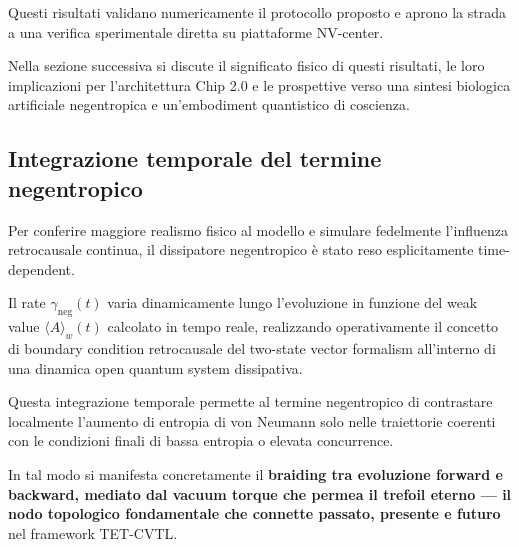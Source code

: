 \documentclass[11pt,a4paper]{article}
\theoremstyle{plain}
\theoremstyle{definition}
\begin{document}
\vspace{0.3cm}

Questi risultati validano numericamente il protocollo proposto e aprono la strada a una verifica sperimentale diretta su piattaforme NV-center. 

\vspace{0.2cm}


Nella sezione successiva si discute il significato fisico di questi risultati, le loro implicazioni per l'architettura Chip 2.0 e le prospettive verso una sintesi biologica artificiale negentropica e un'embodiment quantistico di coscienza.



\vspace{0.5cm}








\subsection{Integrazione temporale del termine negentropico}

\vspace{0.2cm}

Per conferire maggiore realismo fisico al modello e simulare fedelmente l’influenza retrocausale continua, il dissipatore negentropico è stato reso esplicitamente time-dependent. 

\vspace{0.3cm}


Il rate \(\gamma_{\text{neg}}(t)\) varia dinamicamente lungo l’evoluzione in funzione del weak value \(\langle A \rangle_w(t)\) calcolato in tempo reale, realizzando operativamente il concetto di boundary condition retrocausale del two-state vector formalism all’interno di una dinamica open quantum system dissipativa.

\vspace{0.3cm}

Questa integrazione temporale permette al termine negentropico di contrastare localmente l’aumento di entropia di von Neumann solo nelle traiettorie coerenti con le condizioni finali di bassa entropia o elevata concurrence. 


\vspace{0.2cm}


In tal modo si manifesta concretamente il \textbf{braiding tra evoluzione forward e backward, mediato dal vacuum torque che permea il trefoil eterno — il nodo topologico fondamentale che connette passato, presente e futuro} nel framework TET-CVTL. 
\end{document}
